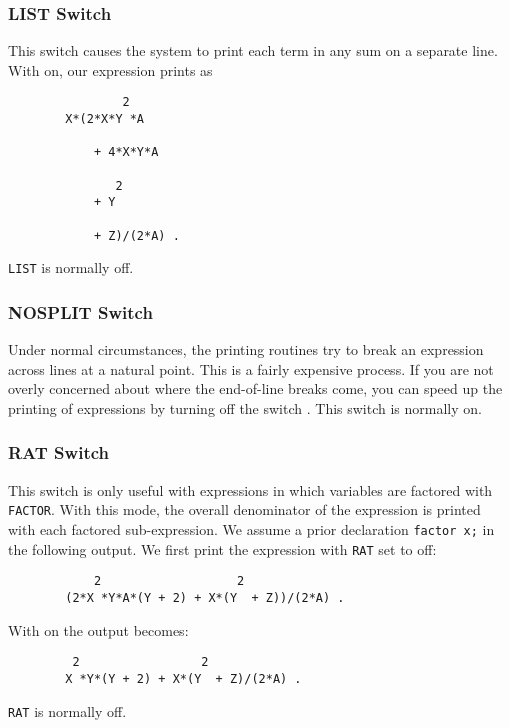 \subsubsection{LIST Switch}
\hypertarget{switch:LIST}{}

This switch causes the system to print each term in any sum on a separate
line. With  on, our expression prints as
\begin{verbatim}
                2
        X*(2*X*Y *A

            + 4*X*Y*A

               2
            + Y

            + Z)/(2*A) .
\end{verbatim}
\texttt{LIST} is normally off.

\subsubsection{NOSPLIT Switch}
\hypertarget{switch:NOSPLIT}{}

Under normal circumstances, the printing routines try to break an expression
across lines at a natural point.  This is a fairly expensive process.  If
you are not overly concerned about where the end-of-line breaks come, you
can speed up the printing of expressions by turning off the switch
.  This switch is normally on.

\subsubsection{RAT Switch}
\hypertarget{switch:RAT}{}

This switch is only useful with expressions in which variables are
factored with \texttt{FACTOR}. With this mode, the overall denominator of the
expression is printed with each factored sub-expression. We assume a prior
declaration \texttt{factor x;} in the following output. We first print the
expression with \texttt{RAT} set to off:
\begin{verbatim}
            2                   2
        (2*X *Y*A*(Y + 2) + X*(Y  + Z))/(2*A) .
\end{verbatim}
With  on the output becomes:
\begin{verbatim}
         2                 2
        X *Y*(Y + 2) + X*(Y  + Z)/(2*A) .
\end{verbatim}
\texttt{RAT} is normally off.

